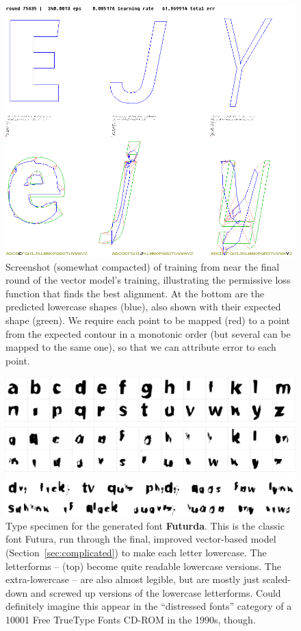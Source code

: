 \documentclass[twocolumn]{article} %
\begin{document}
\begin{figure}[ht]
\centering
  \includegraphics[width=0.95 \linewidth]{trainingrotate}
\caption{ Screenshot (somewhat compacted) of training from near the
  final round of the vector model's training, illustrating the
  permissive loss function that finds the best alignment. At the bottom are
  the predicted lowercase shapes (blue), also shown with their
  expected shape (green). We require each point to be mapped (red)
  to a point from the expected contour in a monotonic order (but
  several can be mapped to the same one), so that we can attribute
  error to each point.
} \label{fig:trainingrotate}
\end{figure}


\begin{figure}[tp]
\centering
  \includegraphics[width=0.95 \linewidth]{futurda}
\caption{ Type specimen for the generated font {\bf Futurda}. This is
  the classic font Futura, run through the final, improved
  vector-based model (Section~\ref{sec:complicated}) to make each
  letter lowercase. The letterforms --
  (top) become quite readable lowercase versions. The extra-lowercase
  -- are also almost legible, but are
  mostly just scaled-down and screwed up versions of the lowercase
  letterforms. Could definitely imagine this appear in the
  ``distressed fonts'' category of a 10001 Free TrueType Fonts CD-ROM
  in the 1990s, though.
} \label{fig:futurda}
\end{figure}
\end{document}
